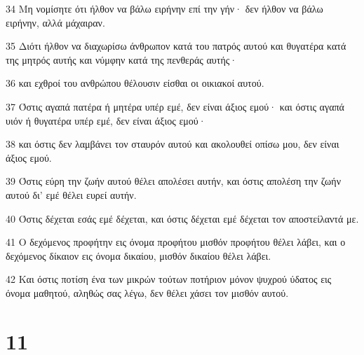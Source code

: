 \par 34 Μη νομίσητε ότι ήλθον να βάλω ειρήνην επί την γήν· δεν ήλθον να βάλω ειρήνην, αλλά μάχαιραν.
\par 35 Διότι ήλθον να διαχωρίσω άνθρωπον κατά του πατρός αυτού και θυγατέρα κατά της μητρός αυτής και νύμφην κατά της πενθεράς αυτής·
\par 36 και εχθροί του ανθρώπου θέλουσιν είσθαι οι οικιακοί αυτού.
\par 37 Όστις αγαπά πατέρα ή μητέρα υπέρ εμέ, δεν είναι άξιος εμού· και όστις αγαπά υιόν ή θυγατέρα υπέρ εμέ, δεν είναι άξιος εμού·
\par 38 και όστις δεν λαμβάνει τον σταυρόν αυτού και ακολουθεί οπίσω μου, δεν είναι άξιος εμού.
\par 39 Όστις εύρη την ζωήν αυτού θέλει απολέσει αυτήν, και όστις απολέση την ζωήν αυτού δι' εμέ θέλει ευρεί αυτήν.
\par 40 Όστις δέχεται εσάς εμέ δέχεται, και όστις δέχεται εμέ δέχεται τον αποστείλαντά με.
\par 41 Ο δεχόμενος προφήτην εις όνομα προφήτου μισθόν προφήτου θέλει λάβει, και ο δεχόμενος δίκαιον εις όνομα δικαίου, μισθόν δικαίου θέλει λάβει.
\par 42 Και όστις ποτίση ένα των μικρών τούτων ποτήριον μόνον ψυχρού ύδατος εις όνομα μαθητού, αληθώς σας λέγω, δεν θέλει χάσει τον μισθόν αυτού.

\chapter{11}

